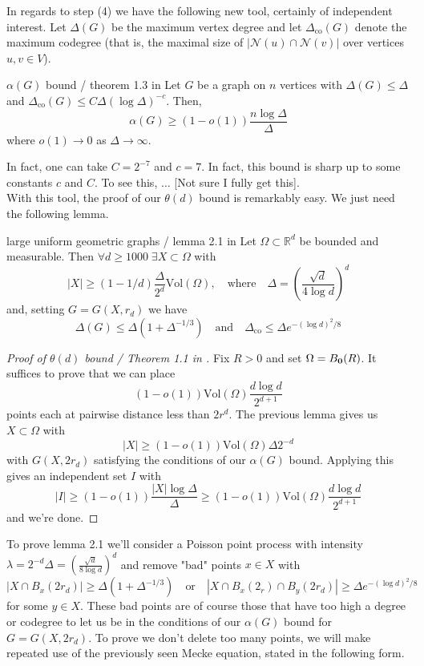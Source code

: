 \documentclass{article}
\begin{document}
In regards to step (4) we have the following new tool, certainly of independent interest. Let $\Delta(G)$ be the 
maximum vertex degree and let $\Delta_\text{co}(G)$ denote the maximum codegree (that is, the maximal size of 
$|\mathcal{N}(u)\cap \mathcal{N}(v)|$ over vertices $u, v \in V$). 

\begin{theorem}[]{$\alpha(G)$ bound / theorem 1.3 in \cite{campos2023}}
    Let $G$ be a graph on $n$ vertices with $\Delta(G) \leq \Delta$ and $\Delta_\text{co}(G) \leq C\Delta (\log \Delta)^{-c}$. 
    Then, \[\alpha(G) \geq (1 - o(1))\frac{n \log \Delta}{\Delta}\] where $o(1) \to 0$ as $\Delta \to \infty$.
\end{theorem}

In fact, one can take $C = 2^{-7}$ and $c = 7$. In fact, this bound is sharp up to some constants $c$ and $C$. To see 
this, $\dots$ [Not sure I fully get this]. \\

With this tool, the proof of our $\theta(d)$ bound is remarkably easy. We just need the following lemma. 

\begin{lemma}[]{large uniform geometric graphs / lemma 2.1 in \cite{campos2023}}
    Let $\Omega \subset \mathbb{R}^d$ be bounded and measurable. Then $\forall d \geq 1000 \; \exists X \subset \Omega$ 
    with \[|X| \geq (1-1/d)\frac{\Delta}{2^d}\text{Vol}(\Omega), \quad \text{where} \quad \Delta = 
    \left(\frac{\sqrt{d}}{4\log d}\right)^d\] and, setting $G = G(X, r_d)$ we have 
    \[\Delta(G) \leq \Delta(1 + \Delta^{-1/3}) \quad \text{and} \quad \Delta_\text{co} \leq \Delta e^{-(\log d)^2/8}\]
\end{lemma}

\begin{proof}[Proof of $\theta(d)$ bound / Theorem 1.1 in \cite{campos2023}]
    Fix $R > 0$ and set $\Omega = B_{{\bf 0}}(R)$. It suffices to prove that we can place \[(1 - o(1))\text{Vol}(\Omega)
    \frac{d\log d}{2^{d+1}}\] points each at pairwise distance less than $2r^d$. The previous lemma 
    gives us $X \subset \Omega$ with \[|X| \geq (1-o(1))\text{Vol}(\Omega)\Delta 2^{-d}\] with $G(X, 2r_d)$ satisfying 
    the conditions of our $\alpha(G)$ bound. Applying this gives an independent set $I$ with \[|I| \geq (1-o(1))
    \frac{|X|\log \Delta}{\Delta} \geq (1-o(1))\text{Vol}(\Omega)\frac{d\log d}{2^{d+1}}\] and we're done.
\end{proof}

To prove lemma 2.1 we'll consider a Poisson point process with intensity $\lambda=2^{-d}\Delta=
\left(\frac{\sqrt{d}}{8\log d}\right)^d$ and remove "bad" points $x \in X$ with 
\[|X \cap B_x(2r_d)| \geq \Delta(1+\Delta^{-1/3}) \quad \text{or} \quad |X \cap B_x(2_r) \cap B_y(2r_d)| \geq 
\Delta e^{-(\log d)^2/8}\] for some $y \in X$. These bad points are of course those that have too high a degree 
or codegree to let us be in the conditions of our $\alpha(G)$ bound for $G = G(X, 2r_d)$. To prove we don't delete 
too many points, we will make repeated use of the previously seen Mecke equation, stated in the following form. 
\end{document}
